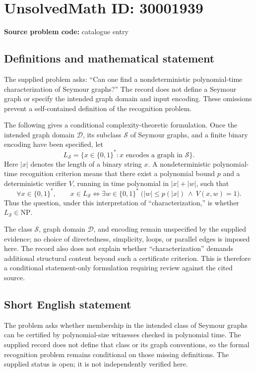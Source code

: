 \documentclass[11pt]{article}
\begin{document}
\section*{UnsolvedMath ID: 30001939}
\textbf{Source problem code:} catalogue entry
\subsection{Definitions and mathematical statement}
The supplied problem asks: ``Can one find a nondeterministic polynomial-time characterization of Seymour graphs?'' The record does not define a Seymour graph or specify the intended graph domain and input encoding. These omissions prevent a self-contained definition of the recognition problem.

The following gives a conditional complexity-theoretic formulation. Once the intended graph domain \(\mathcal D\), its subclass \(\mathcal S\) of Seymour graphs, and a finite binary encoding have been specified, let
\[
L_{\mathcal S}=\{x\in\{0,1\}^{*}:x\text{ encodes a graph in }\mathcal S\}.
\]
Here \(|x|\) denotes the length of a binary string \(x\). A nondeterministic polynomial-time recognition criterion means that there exist a polynomial bound \(p\) and a deterministic verifier \(V\), running in time polynomial in \(|x|+|w|\), such that
\[
\forall x\in\{0,1\}^{*},\qquad
x\in L_{\mathcal S}
\iff
\exists w\in\{0,1\}^{*}\;
\bigl(|w|\le p(|x|)\ \land\ V(x,w)=1\bigr).
\]
Thus the question, under this interpretation of ``characterization,'' is whether \(L_{\mathcal S}\in\mathrm{NP}\).

The class \(\mathcal S\), graph domain \(\mathcal D\), and encoding remain unspecified by the supplied evidence; no choice of directedness, simplicity, loops, or parallel edges is imposed here. The record also does not explain whether ``characterization'' demands additional structural content beyond such a certificate criterion. This is therefore a conditional statement-only formulation requiring review against the cited source.
\subsection{Short English statement}
The problem asks whether membership in the intended class of Seymour graphs can be certified by polynomial-size witnesses checked in polynomial time. The supplied record does not define that class or its graph conventions, so the formal recognition problem remains conditional on those missing definitions. The supplied status is open; it is not independently verified here.
\end{document}
